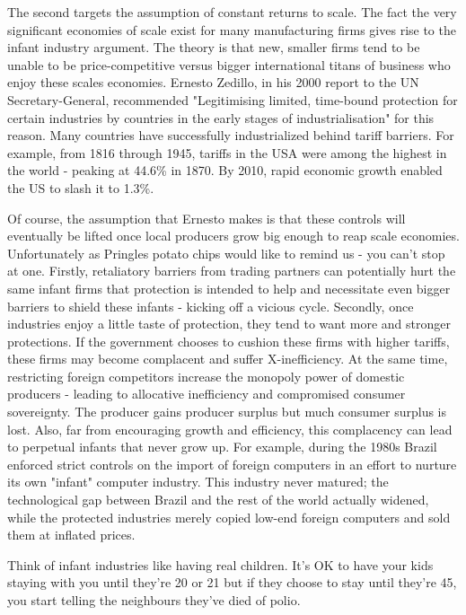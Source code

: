 The second targets the assumption of constant returns to scale. The fact the very significant economies of scale exist for many manufacturing firms gives rise to the infant industry argument. The theory is that new, smaller firms tend to be unable to be price-competitive versus bigger international titans of business who enjoy these scales economies. Ernesto Zedillo, in his 2000 report to the UN Secretary-General, recommended "Legitimising limited, time-bound protection for certain industries by countries in the early stages of industrialisation" for this reason. Many countries have successfully industrialized behind tariff barriers. For example, from 1816 through 1945, tariffs in the USA were among the highest in the world - peaking at 44.6\% in 1870. By 2010, rapid economic growth enabled the US to slash it to 1.3\%.

Of course, the assumption that Ernesto makes is that these controls will eventually be lifted once local producers grow big enough to reap scale economies. Unfortunately as Pringles potato chips would like to remind us - you can't stop at one. Firstly, retaliatory barriers from trading partners can potentially hurt the same infant firms that protection is intended to help and necessitate even bigger barriers to shield these infants - kicking off a vicious cycle. Secondly, once industries enjoy a little taste of protection, they tend to want more and stronger protections. If the government chooses to cushion these firms with higher tariffs, these firms may become complacent and suffer X-inefficiency. At the same time, restricting foreign competitors increase the monopoly power of domestic producers - leading to allocative inefficiency and compromised consumer sovereignty. The producer gains producer surplus but much consumer surplus is lost. Also, far from encouraging growth and efficiency, this complacency can lead to perpetual infants that never grow up. For example, during the 1980s Brazil enforced strict controls on the import of foreign computers in an effort to nurture its own "infant" computer industry. This industry never matured; the technological gap between Brazil and the rest of the world actually widened, while the protected industries merely copied low-end foreign computers and sold them at inflated prices. 

Think of infant industries like having real children. It's OK to have your kids staying with you until they're 20 or 21 but if they choose to stay until they're 45, you start telling the neighbours they've died of polio.

